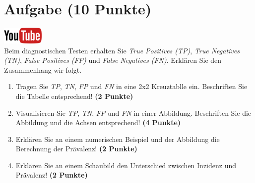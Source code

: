 \documentclass[a4paper, 9pt]{scrartcl}\usepackage[]{graphicx}\usepackage[]{xcolor}
\begin{document}
\vspace{1cm}
 




 
\clearpage

\section{Aufgabe \hfill (10 Punkte)}

\hfill\href{https://youtu.be/G-_r2KplGTI}{\includegraphics[width =
  2cm]{img/youtube}}\\[1Ex]


Beim diagnostischen Testen erhalten Sie \textit{True Positives (TP)},
\textit{True Negatives (TN)}, \textit{False Positives (FP)} und
\textit{False Negatives (FN)}. Erkl{\"a}ren Sie den Zusammenhang wir folgt.

\begin{enumerate}
\item Tragen Sie \textit{TP}, \textit{TN}, \textit{FP} und \textit{FN} in
  eine 2x2 Kreuztablle ein. Beschriften Sie die Tabelle entsprechend!
  \textbf{(2 Punkte)}
\item Visualisieren Sie \textit{TP}, \textit{TN}, \textit{FP} und
  \textit{FN} in einer Abbildung. Beschriften Sie die Abbildung und die
  Achsen entsprechend! \textbf{(4 Punkte)}
\item Erkl{\"a}ren Sie an einem numerischen Beispiel und der Abbildung die
  Berechnung der Pr{\"a}valenz!  \textbf{(2 Punkte)}
\item Erkl{\"a}ren Sie an einem Schaubild den Unterschied zwischen Inzidenz und
  Pr{\"a}valenz!  \textbf{(2 Punkte)}
\end{enumerate}
\end{document}
